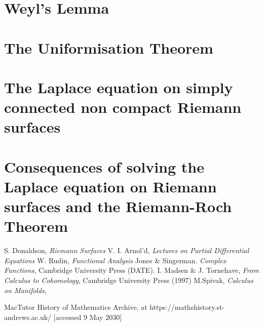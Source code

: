 \documentclass[a4paper,12pt]{report}
\theoremstyle{plain}
\theoremstyle{definition}
\begin{document}
\section{Weyl's Lemma}
\section{The Uniformisation Theorem}
\section{The Laplace equation on simply connected non compact Riemann surfaces}
\section{Consequences of solving the Laplace equation on Riemann surfaces and the Riemann-Roch Theorem}
%
\begin{thebibliography}{99}
 S. Donaldson, {\em Riemann Surfaces}
 V. I. Arnol'd, {\em Lectures on Partial Differential Equations}
 W. Rudin, {\em Functional Analysis}
 Jones \& Singerman. {\em Complex Functions}, Cambridge University Press (DATE).
 I. Madsen \& J. Tornehave, {\em From Calculus to Cohomology}, Cambridge University Press (1997)
 M.Spivak, {\em Calculus on Manifolds}, 

%
 MacTutor History of Mathematics Archive, at https://mathshistory.st-andrews.ac.uk/ [accessed 9 May 2030]
\end{thebibliography}
\end{document}
